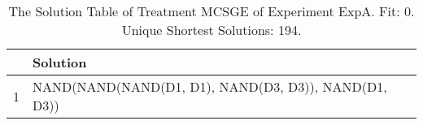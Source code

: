 \begin{table}[ht]
\centering
\begin{tabular}{rp{9cm}}
  \hline
 & Solution \\ 
  \hline
1 & NAND(NAND(NAND(D1, D1), NAND(D3, D3)), NAND(D1, D3)) \\ 
   \hline
\end{tabular}
\caption{The Solution Table of Treatment MCSGE of Experiment ExpA. Fit: 0. Unique Shortest Solutions: 194.} 
\end{table}

